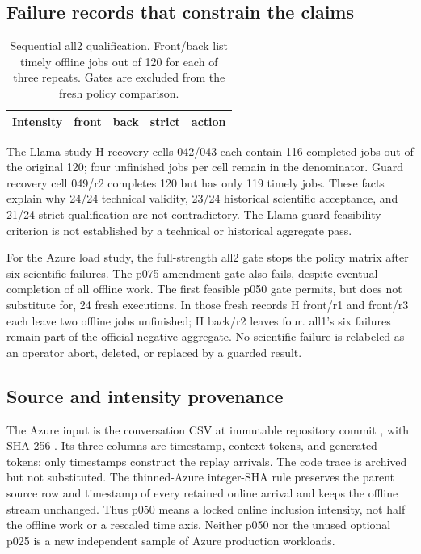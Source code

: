 \subsection{Failure records that constrain the claims}
\begin{table}[t]
\centering
\small
\caption{Sequential all2 qualification. Front/back list timely offline jobs
out of 120 for each of three repeats. Gates are excluded from the fresh policy
comparison.}
\label{tab:loadgate}
\setlength{\tabcolsep}{2pt}
\par\vspace{4pt}
\begin{tabular*}{\linewidth}{@{\extracolsep{\fill}}lrrrl@{}}
\toprule
Intensity & front & back & strict & action\\
\midrule

\end{tabular*}
\end{table}
The Llama study H recovery cells 042/043 each contain 116 completed jobs out of the original
120; four unfinished jobs per cell remain in the denominator. Guard recovery
cell 049/r2 completes 120 but has only 119 timely jobs. These facts explain why
24/24 technical validity, 23/24 historical scientific acceptance, and 21/24
strict qualification are not contradictory. The Llama guard-feasibility criterion is not established by a
technical or historical aggregate pass.

For the Azure load study, the full-strength all2 gate stops the policy matrix after six scientific
failures. The p075 amendment gate also fails, despite eventual completion of all
offline work. The first feasible p050 gate permits, but does not substitute for,
24 fresh executions. In those fresh records H front/r1 and front/r3 each leave
two offline jobs unfinished; H back/r2 leaves four. all1's six failures remain
part of the official negative aggregate. No scientific failure is relabeled as
an operator abort, deleted, or replaced by a guarded result.

\subsection{Source and intensity provenance}
The Azure input is the conversation CSV at immutable repository commit
, with SHA-256
.
Its three columns are timestamp, context tokens, and generated tokens; only
timestamps construct the replay arrivals. The code trace is archived but not
substituted. The thinned-Azure integer-SHA rule preserves the parent source row and
timestamp of every retained online arrival and keeps the offline stream unchanged.
Thus p050 means a locked online inclusion intensity, not half the offline work
or a rescaled time axis. Neither p050 nor the unused optional p025 is a new
independent sample of Azure production workloads.

